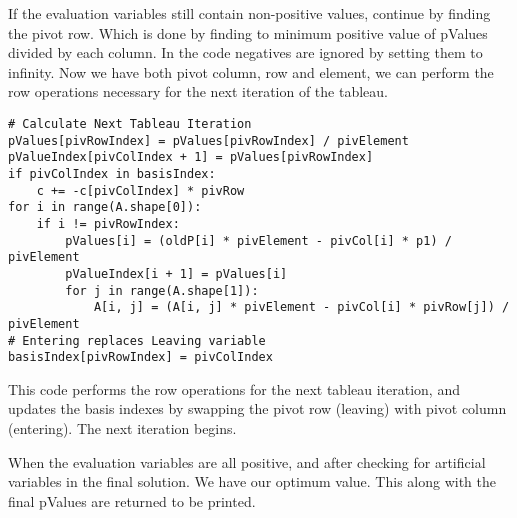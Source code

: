 \documentclass[letterpaper, a4paper]{article}
\begin{document}
If the evaluation variables still contain non-positive values, continue by finding the pivot row. Which is done by finding to minimum positive value of pValues divided by each column. In the code negatives are ignored by setting them to infinity.
Now we have both pivot column, row and element, we can perform the row operations necessary for the next iteration of the tableau.

\begingroup
\fontsize{8}{10}\selectfont
\begin{verbatim}
# Calculate Next Tableau Iteration
pValues[pivRowIndex] = pValues[pivRowIndex] / pivElement
pValueIndex[pivColIndex + 1] = pValues[pivRowIndex]
if pivColIndex in basisIndex:
    c += -c[pivColIndex] * pivRow
for i in range(A.shape[0]):
    if i != pivRowIndex:
        pValues[i] = (oldP[i] * pivElement - pivCol[i] * p1) / pivElement
        pValueIndex[i + 1] = pValues[i]
        for j in range(A.shape[1]):
            A[i, j] = (A[i, j] * pivElement - pivCol[i] * pivRow[j]) / pivElement
# Entering replaces Leaving variable
basisIndex[pivRowIndex] = pivColIndex
\end{verbatim}
\endgroup
This code performs the row operations for the next tableau iteration, and updates the basis indexes by swapping the pivot row (leaving) with pivot column (entering). The next iteration begins.

When the evaluation variables are all positive, and after checking for artificial variables in the final solution. We have our optimum value. This along with the final pValues are returned to be printed.
\end{document}
